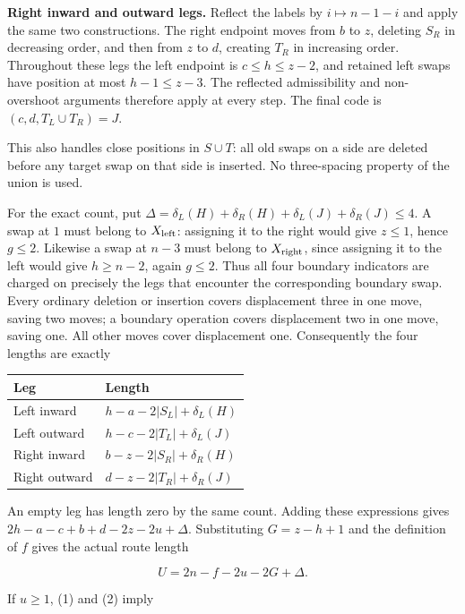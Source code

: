 \documentclass[11pt,a4paper]{article}
\begin{document}
\textbf{Right inward and outward legs.} Reflect the labels by \(i\mapsto n-1-i\) and apply the same two constructions. The right endpoint moves from \(b\) to \(z\), deleting \(S_R\) in decreasing order, and then from \(z\) to \(d\), creating \(T_R\) in increasing order. Throughout these legs the left endpoint is \(c\le h\le z-2\), and retained left swaps have position at most \(h-1\le z-3\). The reflected admissibility and non-overshoot arguments therefore apply at every step. The final code is \((c,d,T_L\cup T_R)=J\).

This also handles close positions in \(S\cup T\): all old swaps on a side are deleted before any target swap on that side is inserted. No three-spacing property of the union is used.

For the exact count, put \(\Delta=\delta_L(H)+\delta_R(H)+\delta_L(J)+\delta_R(J)\le4\). A swap at \(1\) must belong to \(X_{\rm left}\): assigning it to the right would give \(z\le1\), hence \(g\le2\). Likewise a swap at \(n-3\) must belong to \(X_{\rm right}\), since assigning it to the left would give \(h\ge n-2\), again \(g\le2\). Thus all four boundary indicators are charged on precisely the legs that encounter the corresponding boundary swap. Every ordinary deletion or insertion covers displacement three in one move, saving two moves; a boundary operation covers displacement two in one move, saving one. All other moves cover displacement one. Consequently the four lengths are exactly

\begin{longtable}[]{@{}ll@{}}
\toprule\noalign{}
Leg & Length \\
\midrule\noalign{}
\endhead
\bottomrule\noalign{}
\endlastfoot
Left inward & \(h-a-2\lvert S_L\rvert+\delta_L(H)\) \\
Left outward & \(h-c-2\lvert T_L\rvert+\delta_L(J)\) \\
Right inward & \(b-z-2\lvert S_R\rvert+\delta_R(H)\) \\
Right outward & \(d-z-2\lvert T_R\rvert+\delta_R(J)\) \\
\end{longtable}

An empty leg has length zero by the same count. Adding these expressions gives \(2h-a-c+b+d-2z-2u+\Delta\). Substituting \(G=z-h+1\) and the definition of \(f\) gives the actual route length

\[ U=2n-f-2u-2G+\Delta. \tag{2} \]

If \(u\ge1\), (1) and (2) imply
\end{document}
